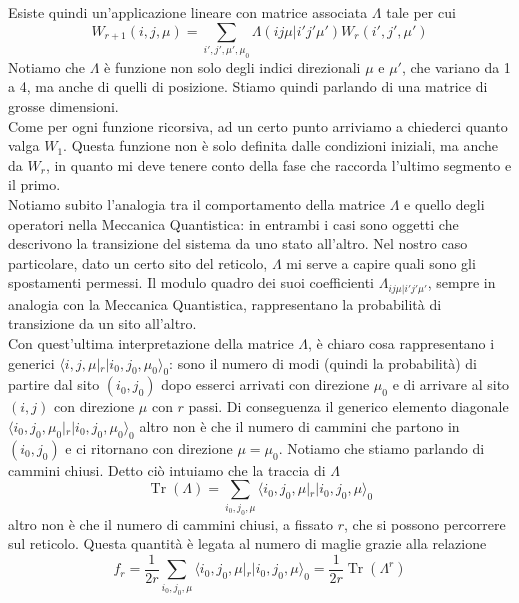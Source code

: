 \documentclass[11pt]{article}
\DeclareMathOperator{\Tr}{Tr}
\begin{document}
Esiste quindi un'applicazione lineare con matrice associata $\Lambda$ tale per cui
\begin{equation}
W_{r+1}(i,j,\mu)=\sum_{i',j',\mu',\mu_0}\Lambda(ij\mu|i'j'\mu')W_{r}(i',j',\mu')
\end{equation}
Notiamo che $\Lambda$ è funzione non solo degli indici direzionali $\mu$ e $\mu'$, che variano da 1 a 4, ma anche di quelli di posizione. Stiamo quindi parlando di una matrice di grosse dimensioni.\\
Come per ogni funzione ricorsiva, ad un certo punto arriviamo a chiederci quanto valga $W_1$. Questa funzione non è solo definita dalle condizioni iniziali, ma anche da $W_r$, in quanto mi deve tenere conto della fase che raccorda l'ultimo segmento e il primo. \\
Notiamo subito l'analogia tra il comportamento della matrice $\Lambda$ e quello degli operatori nella Meccanica Quantistica: in entrambi i casi sono oggetti che descrivono la transizione del sistema da uno stato all'altro. Nel nostro caso particolare, dato un certo sito del reticolo, $\Lambda$ mi serve a capire quali sono gli spostamenti permessi. Il modulo quadro dei suoi coefficienti $\Lambda_{ij \mu | i'j' \mu'}$, sempre in analogia con la Meccanica Quantistica, rappresentano la probabilità di transizione da un sito all'altro.\\
Con quest'ultima interpretazione della matrice $\Lambda$, è chiaro cosa rappresentano i generici $\langle i,j,\mu|_r |i_0,j_0,\mu_0\rangle_0$: sono il numero di modi (quindi la probabilità) di partire dal sito $(i_0,j_0)$ dopo esserci arrivati con direzione $\mu_0$ e di arrivare al sito $(i,j)$ con direzione $\mu$ con $r$ passi. Di conseguenza il generico elemento diagonale $\langle i_0,j_0,\mu_0|_r |i_0,j_0,\mu_0\rangle_0$ altro non è che il numero di cammini che partono in $(i_0,j_0)$ e ci ritornano con direzione $\mu=\mu_0$. Notiamo che stiamo parlando di cammini chiusi.
Detto ciò intuiamo che la traccia di $\Lambda$
$$ \Tr{(\Lambda)}=\sum_{i_0,j_0,\mu} \langle i_0,j_0,\mu|_r |i_0,j_0,\mu\rangle_0
$$ altro non è che il numero di cammini chiusi, a fissato $r$, che si possono percorrere sul reticolo. Questa quantità è legata al numero di maglie grazie alla relazione
\begin{equation}
f_r=\frac{1}{2r}\sum_{i_0,j_0,\mu} \langle i_0,j_0,\mu|_r |i_0,j_0,\mu\rangle_0=\frac{1}{2r}\Tr{(\Lambda^r)}
\end{equation}
\end{document}
